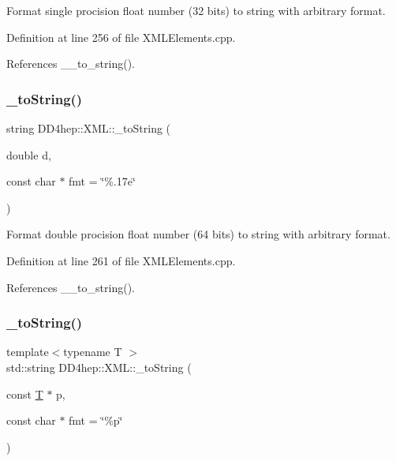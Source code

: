 Format single procision float number (32 bits) to string with arbitrary format. 



Definition at line 256 of file X\+M\+L\+Elements.\+cpp.



References \+\_\+\+\_\+to\+\_\+string().

\hypertarget{group___d_d4_h_e_p___x_m_l_ga101954caf40eafb6b0bc58223764a3d4}{}\label{group___d_d4_h_e_p___x_m_l_ga101954caf40eafb6b0bc58223764a3d4} 
\subsubsection{\texorpdfstring{\+\_\+to\+String()}{\_toString()}\hspace{0.1cm}{\footnotesize\ttfamily [10/12]}}
{\footnotesize\ttfamily string D\+D4hep\+::\+X\+M\+L\+::\+\_\+to\+String (\begin{DoxyParamCaption}\item[{double}]{d,  }\item[{const char $\ast$}]{fmt = {\ttfamily \char`\"{}\%.17e\char`\"{}} }\end{DoxyParamCaption})}



Format double procision float number (64 bits) to string with arbitrary format. 



Definition at line 261 of file X\+M\+L\+Elements.\+cpp.



References \+\_\+\+\_\+to\+\_\+string().

\hypertarget{group___d_d4_h_e_p___x_m_l_gaa022e4ea896faaded8ae9dec1ee003da}{}\label{group___d_d4_h_e_p___x_m_l_gaa022e4ea896faaded8ae9dec1ee003da} 
\subsubsection{\texorpdfstring{\+\_\+to\+String()}{\_toString()}\hspace{0.1cm}{\footnotesize\ttfamily [11/12]}}
{\footnotesize\ttfamily template$<$typename T $>$ \\
std\+::string D\+D4hep\+::\+X\+M\+L\+::\+\_\+to\+String (\begin{DoxyParamCaption}\item[{const \hyperlink{class_t}{T} $\ast$}]{p,  }\item[{const char $\ast$}]{fmt = {\ttfamily \char`\"{}\%p\char`\"{}} }\end{DoxyParamCaption})}



